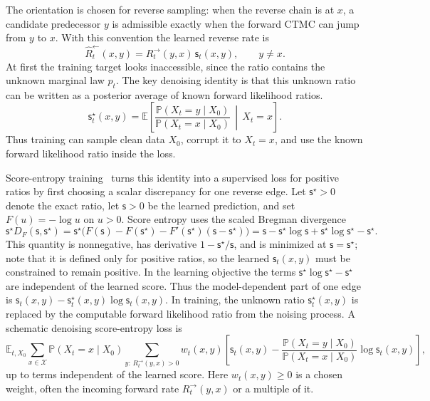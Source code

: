 \documentclass[10pt,a4paper]{amsart}
\numberwithin{equation}{section}
\newcommand{\E}{\mathbb{E}}
\newcommand{\Pp}{\mathbb{P}}
\newcommand{\cX}{\mathcal{X}}
\newcommand{\wh}[1]{\widehat{#1}}
\newcommand{\sstar}{\mathsf{s}^{\star}}
\newcommand{\score}{\mathsf{s}}
\begin{document}
The orientation is chosen for reverse sampling: when the reverse chain is at
$x$, a candidate predecessor $y$ is admissible exactly when the forward CTMC can
jump from $y$ to $x$.  With this convention the learned reverse rate is
\[
    \wh R_t^{\leftarrow}(x,y)
    =
    R_t^{\to}(y,x)\,\score_t(x,y),
    \qquad y\neq x.
\]
At first the training target looks inaccessible, since the ratio contains the
unknown marginal law $p_t$.  The key denoising identity is that this unknown
ratio can be written as a posterior average of known forward likelihood ratios.
\begin{equation}\label{eq:discrete-ratio-denoising-identity}
    \sstar_t(x,y)
    =
    \E\!\left[
    \frac{\Pp(X_t=y\mid X_0)}{\Pp(X_t=x\mid X_0)}
    \,\middle|\, X_t=x
    \right].
\end{equation}
Thus training can sample clean data $X_0$, corrupt it to $X_t=x$, and use the
known forward likelihood ratio inside the loss.

Score-entropy training~\cite{lou2024sedd} turns this identity into a supervised
loss for positive ratios by first choosing a scalar discrepancy for one reverse
edge.  Let $\sstar>0$ denote the exact ratio, let $\score>0$ be the learned
prediction, and set $F(u)=-\log u$ on $u>0$.  Score entropy uses the scaled
Bregman divergence
\[
    \sstar D_F(\score,\sstar)
    =
    \sstar\bigl(F(\score)-F(\sstar)-F'(\sstar)(\score-\sstar)\bigr)
    =
    \score-\sstar\log\score+\sstar\log\sstar-\sstar.
\]
This quantity is nonnegative, has derivative $1-\sstar/\score$, and is minimized
at $\score=\sstar$; note that it is defined only for positive ratios, so the
learned $\score_t(x,y)$ must be constrained to remain positive.  In the learning objective the terms
$\sstar\log\sstar-\sstar$ are independent of the learned score.  Thus the
model-dependent part of one edge is
$\score_t(x,y)-\sstar_t(x,y)\log \score_t(x,y)$.  In training, the unknown
ratio $\sstar_t(x,y)$ is replaced by the computable forward likelihood ratio
from the noising process.
A schematic denoising score-entropy loss is
\begin{equation}\label{eq:score-entropy-loss}
    \E_{t,X_0}
    \sum_{x\in\cX}\Pp(X_t=x\mid X_0)
    \sum_{y:\,R_t^{\to}(y,x)>0}
    w_t(x,y)
    \left[
    \score_t(x,y)
    -
    \frac{\Pp(X_t=y\mid X_0)}{\Pp(X_t=x\mid X_0)}
    \log \score_t(x,y)
    \right],
\end{equation}
up to terms independent of the learned score.  Here $w_t(x,y)\geq0$ is a chosen
weight, often the incoming forward rate $R_t^{\to}(y,x)$ or a multiple of it.
\end{document}
